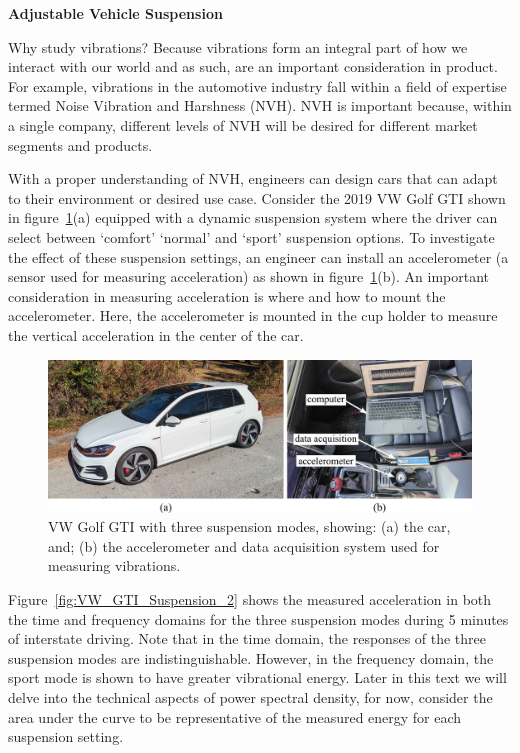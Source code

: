 \documentclass[12pt,letter]{article}
\begin{document}
		\begin{vibration_case_study}

			\textbf{Adjustable Vehicle Suspension}

			\noindent Why study vibrations? Because vibrations form an integral part of how we interact with our world and as such, are an important consideration in product. For example, vibrations in the automotive industry fall within a field of expertise termed Noise Vibration and Harshness (NVH). NVH is important because, within a single company, different levels of NVH will be desired for different market segments and products. 
			
			With a proper understanding of NVH, engineers can design cars that can adapt to their environment or desired use case. Consider the 2019 VW Golf GTI shown in figure~\ref{fig:VW_GTI_Suspension_1}(a) equipped with a dynamic suspension system where the driver can select between `comfort' `normal' and `sport' suspension options. To investigate the effect of these suspension settings, an engineer can install an accelerometer (a sensor used for measuring acceleration) as shown in figure~\ref{fig:VW_GTI_Suspension_1}(b). An important consideration in measuring acceleration is where and how to mount the accelerometer. Here, the accelerometer is mounted in the cup holder to measure the vertical acceleration in the center of the car. 
			\begin{figure}[H]
				\centering
				\includegraphics[width=6in]{../figures/VW_GTI_Suspension_1}
				\caption{VW Golf GTI with three suspension modes, showing: (a) the car, and; (b) the accelerometer and data acquisition system used for measuring vibrations.}
				\label{fig:VW_GTI_Suspension_1}
			\end{figure}
			Figure~\ref{fig:VW_GTI_Suspension_2} shows the measured acceleration in both the time and frequency domains for the three suspension modes during 5 minutes of interstate driving. Note that in the time domain, the responses of the three suspension modes are indistinguishable. However, in the frequency domain, the sport mode is shown to have greater vibrational energy. Later in this text we will delve into the technical aspects of power spectral density, for now, consider the area under the curve to be representative of the measured energy for each suspension setting. 

\end{vibration_case_study}
\end{document}
